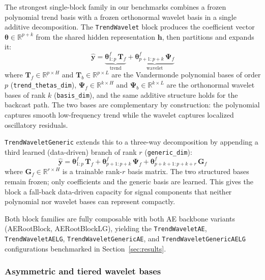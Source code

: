 \documentclass{article}
\begin{document}
The strongest single-block family in our benchmarks combines a frozen polynomial trend basis with a frozen orthonormal wavelet basis in a single additive decomposition. The \texttt{TrendWavelet} block produces the coefficient vector $\boldsymbol{\theta} \in \mathbb{R}^{p + k}$ from the shared hidden representation $\mathbf{h}$, then partitions and expands it:
\begin{equation*}
\hat{\mathbf{y}} = \underbrace{\boldsymbol{\theta}^f_{1:p}\,\mathbf{T}_f}_{\text{trend}} + \underbrace{\boldsymbol{\theta}^f_{p+1:p+k}\,\boldsymbol{\Psi}_f}_{\text{wavelet}}
\end{equation*}
where $\mathbf{T}_f \in \mathbb{R}^{p \times H}$ and $\mathbf{T}_b \in \mathbb{R}^{p \times L}$ are the Vandermonde polynomial bases of order $p$ (\texttt{trend\_thetas\_dim}), $\boldsymbol{\Psi}_f \in \mathbb{R}^{k \times H}$ and $\boldsymbol{\Psi}_b \in \mathbb{R}^{k \times L}$ are the orthonormal wavelet bases of rank $k$ (\texttt{basis\_dim}), and the same additive structure holds for the backcast path. The two bases are complementary by construction: the polynomial captures smooth low-frequency trend while the wavelet captures localized oscillatory residuals.

\texttt{TrendWaveletGeneric} extends this to a three-way decomposition by appending a third learned (data-driven) branch of rank $r$ (\texttt{generic\_dim}):
\begin{equation*}
\hat{\mathbf{y}} = \boldsymbol{\theta}^f_{1:p}\,\mathbf{T}_f + \boldsymbol{\theta}^f_{p+1:p+k}\,\boldsymbol{\Psi}_f + \boldsymbol{\theta}^f_{p+k+1:p+k+r}\,\mathbf{G}_f
\end{equation*}
where $\mathbf{G}_f \in \mathbb{R}^{r \times H}$ is a trainable rank-$r$ basis matrix. The two structured bases remain frozen; only coefficients and the generic basis are learned. This gives the block a fall-back data-driven capacity for signal components that neither polynomial nor wavelet bases can represent compactly.

Both block families are fully composable with both AE backbone variants (AERootBlock, AERootBlockLG), yielding the \texttt{TrendWaveletAE}, \texttt{TrendWaveletAELG}, \texttt{TrendWaveletGenericAE}, and \texttt{TrendWaveletGenericAELG} configurations benchmarked in Section~\ref{sec:results}.

\subsubsection{Asymmetric and tiered wavelet bases}
\end{document}
